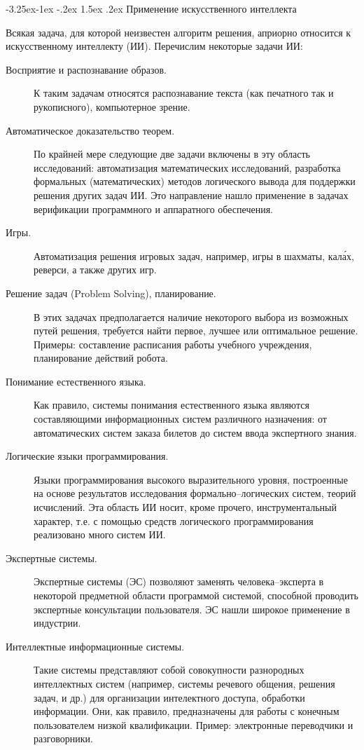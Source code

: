 \documentclass[12pt, openany, twoside]{book} %
\makeatletter
\renewcommand\subsection{\@startsection{subsection}{2}{\z@}%
                                     {-3.25ex\@plus -1ex \@minus -.2ex}%
                                     {1.5ex \@plus .2ex}%
                                     {\normalfont\normalsize\bfseries}}
\makeatother
\begin{document}
\subsection{Применение искусственного интеллекта}

Всякая задача, для которой неизвестен алгоритм решения, априорно относится к искусственному интеллекту (ИИ). Перечислим некоторые задачи ИИ:
\begin{description}
 \item [Восприятие и распознавание образов.] К таким задачам относятся распознавание текста (как печатного так и рукописного), компьютерное зрение.
 \item [Автоматическое доказательство теорем.] По крайней мере следующие две задачи включены в эту область ис\-сле\-до\-ваний: автоматизация математических исследований, разработка формальных (математических) методов логического вывода для поддержки решения других задач ИИ. Это направление нашло применение в задачах верификации программного и аппаратного обеспечения.
 \item [Игры.] Автоматизация решения игровых задач, например, игры в шахматы, кал\'{а}х, реверси, а также других игр.
 \item [Решение задач (Problem Solving), планирование.] В этих задачах предполагается наличие некоторого выбора из возможных путей решения, требуется найти первое, лучшее или оптимальное решение. Примеры: составление расписания работы учебного учреждения, планирование действий робота.
 \item [Понимание естественного языка.] Как правило, си\-сте\-мы понимания естественного языка являются составляющими информационных систем различного назначения: от автоматических систем заказа билетов до систем ввода экспертного знания.
 \item [Логические языки программирования.] Языки программирования  высокого выразительного уровня, построенные на основе результатов исследования формально--ло\-ги\-чес\-ких систем, теорий исчислений. Эта область ИИ носит, кроме прочего, инструментальный характер, т.е. с помощью средств логического программирования реализовано много систем ИИ.
 \item [Экспертные системы.] Экспертные системы  (ЭС) позволяют заменять человека--эксперта в некоторой предметной области программой системой, способной проводить экспертные консультации пользователя. ЭС нашли широкое применение в индустрии.
 \item [Интеллектные информационные системы.] Такие сис\-те\-мы представляют собой совокупности  разнородных интеллектных систем (например, системы речевого общения, решения задач, и др.) для организации интелектного доступа, обработки информации. Они, как правило, предназначены для работы с конечным пользователем низкой квалификации. Пример: электронные переводчики и разговорники.

\end{description}
\end{document}
